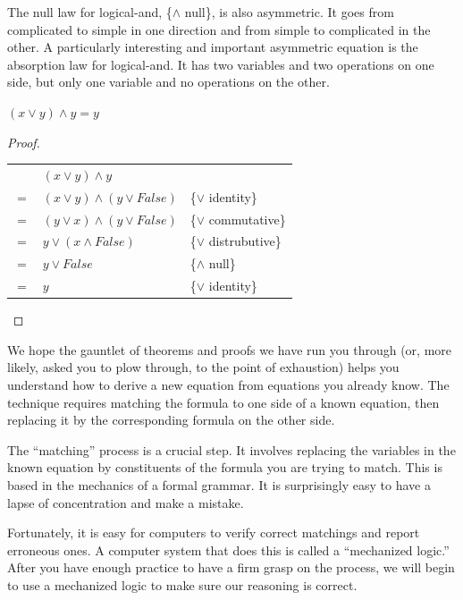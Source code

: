The null law for logical-and, \{$\wedge$ null\}, is also asymmetric. It goes from complicated to simple in one direction and from simple to complicated in the other. A particularly interesting and important asymmetric equation is the absorption law for logical-and. It has two variables and two operations on one side, but only one variable and no operations on the other.

\label{and-absorption-thm}
\begin{theorem}
$(x \vee y) \wedge y = y$
\end{theorem}

\begin{proof}
\mbox{} \\
\begin{tabular}{llp{3.15in}}
    & $(x \vee y) \wedge y$                & \\
$=$ & $(x \vee y) \wedge (y \vee False)$   & \{$\vee$ identity\} \\
$=$ & $(y \vee x) \wedge (y \vee False)$   & \{$\vee$ commutative\} \\
$=$ & $y \vee (x \wedge False)$            & \{$\vee$ distrubutive\} \\
$=$ & $y \vee False$                       & \{$\wedge$ null\} \\
$=$ & $y$                                  & \{$\vee$ identity\} \\
\end{tabular}

\end{proof}

We hope the gauntlet of theorems and proofs we have run you through (or, more likely, asked you to plow through, to the point of exhaustion) helps you understand how to derive a new equation from equations you already know. The technique requires matching the formula to one side of a known equation, then replacing it by the corresponding formula on the other side.

The ``matching'' process is a crucial step. It involves replacing the variables in the known equation by constituents of the formula you are trying to match. This is based in the mechanics of a formal grammar. It is surprisingly easy to have a lapse of concentration and make a mistake.

Fortunately, it is easy for computers to verify correct matchings and report erroneous ones. A computer system that does this is called a ``mechanized logic.'' After you have enough practice to have a firm grasp on the process, we will begin to use a mechanized logic to make sure our reasoning is correct.

